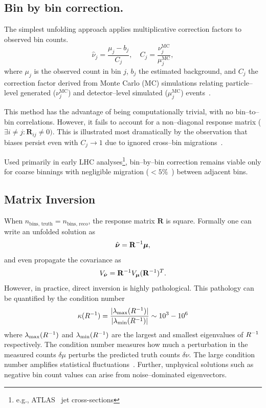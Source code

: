 \subsection{Bin by bin correction.}  
The simplest unfolding approach applies multiplicative correction factors to observed bin counts.
\begin{equation}
    \hat{\nu}_j = \frac{\mu_j - b_j}{C_j}, \quad C_j = \frac{\nu^{\text{MC}}_j}{\mu^{\text{MC}}_j},
\end{equation}  
where \(\mu_j\) is the observed count in bin \(j\), \(b_j\) the estimated background, and \(C_j\) the correction factor derived from Monte Carlo (MC) simulations relating particle--level generated (\(\nu^{\text{MC}}_j\)) and detector--level simulated (\(\mu^{\mathrm{MC}}_j\)) events~\cite{cowan_statistics_2021}. 

This method has the advantage of being computationally trivial, with no bin--to--bin correlations.
%
However, it fails to account for a non--diagonal response matrix (\(\exists i \neq j: \mathbf{R}_{ij} \ne 0)\).
%
This is illustrated most dramatically by the observation that biases persist even with \(C_j \rightarrow 1\) due to ignored cross--bin migrations~\cite{cowan_topics_2010}.

Used primarily in early LHC analyses\footnote{e.g., ATLAS~\cite{aad_measurement_2011, noauthor_implications_nodate} jet cross-sections}, bin--by--bin correction remains viable only for coarse binnings with negligible migration (\(<5\%\)~\cite{cms_collaboration_measurement_2011}) between adjacent bins.

\subsection{Matrix Inversion}  
When \(n_{\text{bins, truth}} = n_{\text{bins, reco}}\), the response matrix $\mathbf{R}$ is square.
%
Formally one can write an unfolded solution as  
\begin{equation}
    \hat{\boldsymbol{\nu}} = \mathbf{R}^{-1}\vb*{\mu},
\end{equation}  
and even propagate the covariance as  
\begin{equation}
    V_{\hat{\boldsymbol{\nu}}} = \mathbf{R}^{-1} V_{\vb*{\mu}} (\mathbf{R}^{-1})^T.
\end{equation}  
However, in practice, direct inversion is highly pathological.
%
This pathology can be quantified by the condition number
\begin{equation}
    \kappa(R^{-1}) = \frac{|\lambda_{\mathrm{max}}(R^{-1})|}{|\lambda_{\mathrm{min}}(R^{-1})|} \sim 10^3 - 10^6
\end{equation}
where $\lambda_{\mathrm{max}}(R^{-1})$ and $\lambda_{\mathrm{min}}(R^{-1})$ are the largest and smallest eigenvalues of $R^{-1}$ respectively.
%
The condition number measures how much a perturbation in the measured counts $\delta\mu$ perturbs the predicted truth counts $\delta\nu$.
%
The large condition number amplifies statistical fluctuations~\cite{belsley_regression_2005, pesaran_time_2015}.
%
Further, unphysical solutions such as negative bin count values can arise from noise--dominated eigenvectors.

